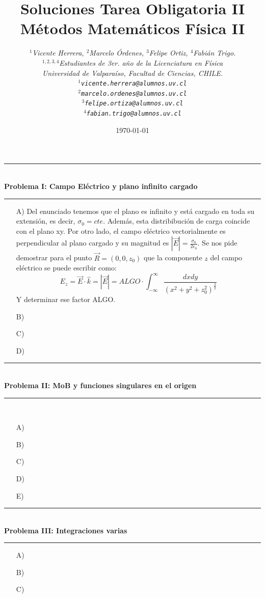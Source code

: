\documentclass[12pt]{article}
\begin{document}
	
	\title{\textbf{Soluciones Tarea Obligatoria II\\ M\'etodos Matem\'aticos F\'isica II }}
	\author{\textit{$^{1}$Vicente Herrera, $^{2}$Marcelo \'Ordenes, $^{3}$Felipe Ortiz, $^{4}$Fabi\'an Trigo.}\\
		\small{\textit{$^{1,2,3,4}$Estudiantes de 3er. a\~{n}o de la Licenciatura en F\'isica}}\\
		\small {\textit{Universidad de Valpara\'iso, Facultad de Ciencias, CHILE.}}\\
		\small{\texttt{$^{1}$\textit{vicente.herrera@alumnos.uv.cl}}}\\
		\small{\texttt{$^{2}$\textit{marcelo.ordenes@alumnos.uv.cl}}}\\
		\small{\texttt{$^{3}$\textit{felipe.ortiza@alumnos.uv.cl}}}\\
		\small{\texttt{$^{4}$\textit{fabian.trigo@alumnos.uv.cl}}}
	}
	\date{\small{\today}}
	
	\maketitle
	\thispagestyle{fancy}

\rule{112mm}{0.1mm}\\
\textbf{Problema I: Campo El\'ectrico y plano infinito cargado}\\
\rule{112mm}{0.1mm}
\begin{enumerate}
	\item [A)] Del enunciado tenemos que el plano es infinito y est\'a cargado en toda su extensi\'on, es decir, $\sigma_{0} = cte.$ Adem\'as, esta distribibuci\'on de carga coincide con el plano xy. Por otro lado, el campo el\'ectrico vectorialmente es perpendicular al plano cargado y su magnitud es $|\vec{E}|= \frac{\sigma_{0}}{2 \epsilon_{0}}$. Se nos pide demostrar para el punto $\vec{R} = (0,0,z_{0})$ que la componente $z$ del campo el\'ectrico se puede escribir como:
	\[ E_{z} = \vec{E} \cdot \hat{k} = |\vec{E}| = ALGO \cdot \int_{-\infty}^{\infty} \frac{dx dy}{(x^{2}+y^{2}+z_{0}^{2})^{\frac{3}{2}}} \]
	Y determinar ese factor ALGO.
	
	\item [B)]
	\item [C)]
	\item [D)] 
\end{enumerate}


\rule{112mm}{0.1mm}\\
\textbf{Problema II: MoB y funciones singulares en el origen}\\
\rule{112mm}{0.1mm}\\
\begin{enumerate}
	\item [A)]
	\item [B)]
	\item [C)]
	\item [D)]
	\item [E)]
\end{enumerate}


\rule{112mm}{0.1mm}\\
\textbf{Problema III: Integraciones varias}\\
\rule{112mm}{0.1mm}
\begin{enumerate}
	\item [A)]
	\item [B)]
	\item [C)]
\end{enumerate}
\end{document}
